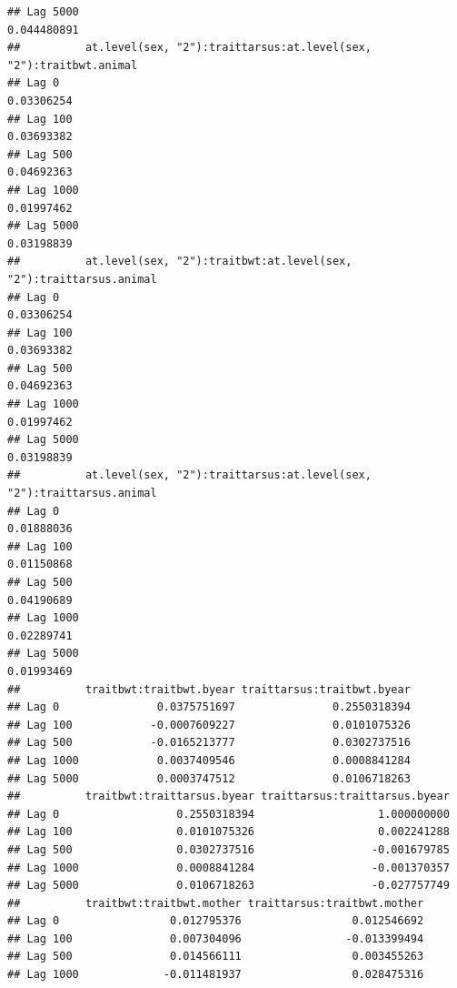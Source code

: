 \documentclass[
  12pt,
]{book}
\begin{document}
\begin{verbatim}
## Lag 5000                                                    0.044480891
##          at.level(sex, "2"):traittarsus:at.level(sex, "2"):traitbwt.animal
## Lag 0                                                           0.03306254
## Lag 100                                                         0.03693382
## Lag 500                                                         0.04692363
## Lag 1000                                                        0.01997462
## Lag 5000                                                        0.03198839
##          at.level(sex, "2"):traitbwt:at.level(sex, "2"):traittarsus.animal
## Lag 0                                                           0.03306254
## Lag 100                                                         0.03693382
## Lag 500                                                         0.04692363
## Lag 1000                                                        0.01997462
## Lag 5000                                                        0.03198839
##          at.level(sex, "2"):traittarsus:at.level(sex, "2"):traittarsus.animal
## Lag 0                                                              0.01888036
## Lag 100                                                            0.01150868
## Lag 500                                                            0.04190689
## Lag 1000                                                           0.02289741
## Lag 5000                                                           0.01993469
##          traitbwt:traitbwt.byear traittarsus:traitbwt.byear
## Lag 0               0.0375751697               0.2550318394
## Lag 100            -0.0007609227               0.0101075326
## Lag 500            -0.0165213777               0.0302737516
## Lag 1000            0.0037409546               0.0008841284
## Lag 5000            0.0003747512               0.0106718263
##          traitbwt:traittarsus.byear traittarsus:traittarsus.byear
## Lag 0                  0.2550318394                   1.000000000
## Lag 100                0.0101075326                   0.002241288
## Lag 500                0.0302737516                  -0.001679785
## Lag 1000               0.0008841284                  -0.001370357
## Lag 5000               0.0106718263                  -0.027757749
##          traitbwt:traitbwt.mother traittarsus:traitbwt.mother
## Lag 0                 0.012795376                 0.012546692
## Lag 100               0.007304096                -0.013399494
## Lag 500               0.014566111                 0.003455263
## Lag 1000             -0.011481937                 0.028475316

\end{verbatim}
\end{document}
